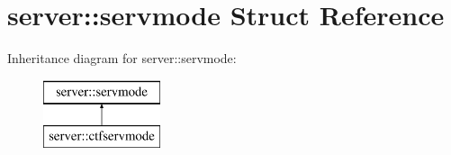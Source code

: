 \hypertarget{structserver_1_1servmode}{}\section{server\+:\+:servmode Struct Reference}
\label{structserver_1_1servmode}
Inheritance diagram for server\+:\+:servmode\+:\begin{figure}[H]
\begin{center}
\leavevmode
\includegraphics[height=2.000000cm]{structserver_1_1servmode}
\end{center}
\end{figure}
